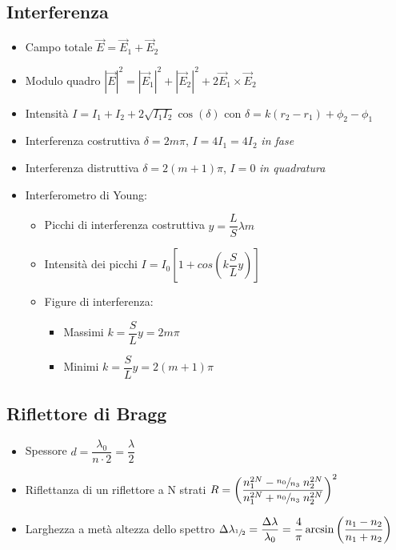 \documentclass[9pt]{extarticle}
\begin{document}
\subsection{Interferenza}
\begin{itemize}
  \item Campo totale \( \vec{E} = \vec{E}_1 + \vec{E}_2 \)
  \item Modulo quadro \( \displaystyle |\vec{E}| ^ 2 = |\vec{E}_1| ^ 2 + |\vec{E}_2| ^ 2 + 2 \vec{E}_1 \times \vec{E}_2 \)
  \item Intensità \( \displaystyle  I = I_1 + I_2 + 2 \sqrt{I_1 I_2} \cos(\delta) \) con \( \delta = k(r_2 - r_1) + \phi_2 - \phi_1 \) %
  \item Interferenza costruttiva \( \delta = 2 m \pi \), \(I = 4 I_1 = 4 I_2 \) \textit{in fase}
  \item Interferenza distruttiva \( \delta = 2 (m + 1) \pi \), \(I = 0 \) \textit{in quadratura}
  \item Interferometro di Young:
        \begin{itemize}
          \item Picchi di interferenza costruttiva \( y = \dfrac{L}{S} \lambda m \)
          \item Intensità dei picchi \( I = I_0  \left[ 1 + cos\left( k \dfrac{S}{L} y \right) \right] \)
          \item Figure di interferenza:
                \begin{itemize}
                  \item Massimi \( k = \dfrac{S}{L} y = 2m \pi \)
                  \item Minimi \( k = \dfrac{S}{L} y = 2(m+1) \pi \)
                \end{itemize}
        \end{itemize}
\end{itemize}

\newpage

\subsection{Riflettore di Bragg}
\begin{itemize}
  \item Spessore \( d = \dfrac{\lambda_0}{n \cdot 2} = \dfrac{\lambda}{2} \)
  \item Riflettanza di un riflettore a N strati \( R = \left( \dfrac{n_1 ^ {2N} - \sfrac{n_0}{n_3} \; n_2 ^ {2N}}{n_1 ^ {2N} + \sfrac{n_0}{n_3} \; n_2 ^ {2N}} \right) ^ 2 \)
  \item Larghezza a metà altezza dello spettro \( \Delta \lambda_{\sfrac{1}{2}} = \dfrac{\Delta \lambda}{\lambda_0} = \dfrac{4}{\pi} \arcsin \left( \dfrac{n_1 - n_2}{n_1 + n_2} \right) \)
\end{itemize}
\end{document}
